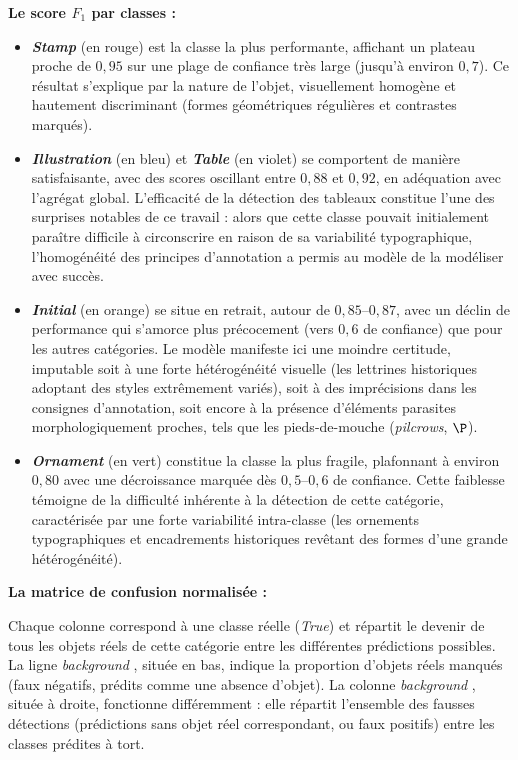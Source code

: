 {\raggedright\textbf{Le score $F_1$ par classes :}}
\begin{itemize}
	\item \textbf{\textit{Stamp}} (en rouge) est la classe la plus performante, affichant un plateau proche de $0{,}95$ sur une plage de confiance très large (jusqu'à environ $0{,}7$). Ce résultat s'explique par la nature de l'objet, visuellement homogène et hautement discriminant (formes géométriques régulières et contrastes marqués).
	
	\item \textbf{\textit{Illustration}} (en bleu) et \textbf{\textit{Table}} (en violet) se comportent de manière satisfaisante, avec des scores oscillant entre $0{,}88$ et $0{,}92$, en adéquation avec l'agrégat global. L'efficacité de la détection des tableaux constitue l'une des surprises notables de ce travail : alors que cette classe pouvait initialement paraître difficile à circonscrire en raison de sa variabilité typographique, l'homogénéité des principes d'annotation a permis au modèle de la modéliser avec succès.
	
	\item \textbf{\textit{Initial}} (en orange) se situe en retrait, autour de $0{,}85\text{--}0{,}87$, avec un déclin de performance qui s'amorce plus précocement (vers $0{,}6$ de confiance) que pour les autres catégories. Le modèle manifeste ici une moindre certitude, imputable soit à une forte hétérogénéité visuelle (les lettrines historiques adoptant des styles extrêmement variés), soit à des imprécisions dans les consignes d'annotation, soit encore à la présence d'éléments parasites morphologiquement proches, tels que les pieds-de-mouche (\textit{pilcrows}, $\P$).
	
	\item \textbf{\textit{Ornament}} (en vert) constitue la classe la plus fragile, plafonnant à environ $0{,}80$ avec une décroissance marquée dès $0{,}5\text{--}0{,}6$ de confiance. Cette faiblesse témoigne de la difficulté inhérente à la détection de cette catégorie, caractérisée par une forte variabilité intra-classe (les ornements typographiques et encadrements historiques revêtant des formes d'une grande hétérogénéité).
\end{itemize}

{\raggedright\textbf{La matrice de confusion normalisée :}}

Chaque colonne correspond à une classe réelle (\textit{True}) et répartit le devenir de tous les objets réels de cette catégorie entre les différentes prédictions possibles. La ligne \og \textit{background} \fg, située en bas, indique la proportion d'objets réels manqués (faux négatifs, prédits comme une absence d'objet). La colonne \og \textit{background} \fg, située à droite, fonctionne différemment : elle répartit l'ensemble des fausses détections (prédictions sans objet réel correspondant, ou faux positifs) entre les classes prédites à tort.

